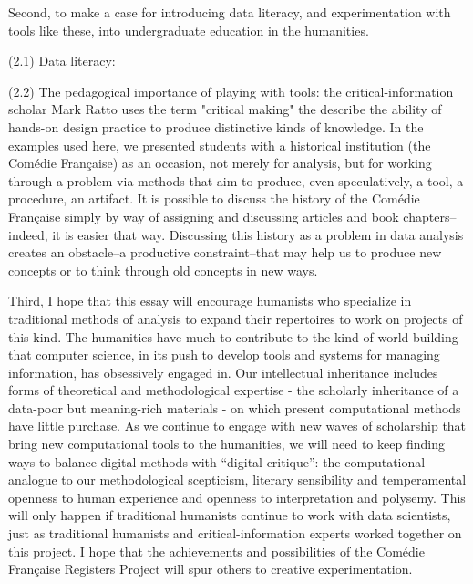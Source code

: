 \documentclass[	DIV=calc,%
							paper=a4,%
							fontsize=11pt,%
							twocolumn]{scrartcl}	 					%
\begin{document}
Second, to make a case for introducing data literacy, and experimentation with tools like these, into undergraduate education in the humanities.

(2.1) Data literacy:

(2.2) The pedagogical importance of playing with tools: the critical-information scholar Mark Ratto uses the term "critical making" the describe the ability of hands-on design practice to produce distinctive kinds of knowledge.  In the examples used here, we presented students with a historical institution (the Comédie Française) as an occasion, not merely for analysis, but for working through a problem via methods that aim to produce, even speculatively, a tool, a procedure, an artifact.  It is possible to discuss the history of the Comédie Française simply by way of assigning and discussing articles and book chapters--indeed, it is easier that way.  Discussing this history as a problem in data analysis creates an obstacle--a productive constraint--that may help us to produce new concepts or to think through old concepts in new ways.

Third, I hope that this essay will encourage humanists who specialize in traditional methods of analysis to expand their repertoires to work on projects of this kind.  The humanities have much to contribute to the kind of world-building that computer science, in its push to develop tools and systems for managing information, has obsessively engaged in.  Our intellectual inheritance includes forms of theoretical and methodological expertise - the scholarly inheritance of a data-poor but meaning-rich materials - on which present computational methods have little purchase.  As we continue to engage with new waves of scholarship that bring new computational tools to the humanities, we will need to keep finding ways to balance digital methods with ``digital critique'': the computational analogue to our methodological scepticism, literary sensibility and temperamental openness to human experience and openness to interpretation and polysemy.  This will only happen if traditional humanists continue to work with data scientists, just as traditional humanists and critical-information experts worked together on this project.  I hope that the achievements and possibilities of the Comédie Française Registers Project will spur others to creative experimentation.


\printbibliography
\end{document}
